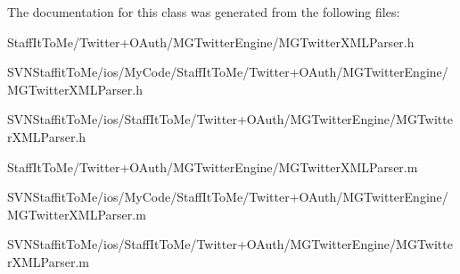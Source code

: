 \-The documentation for this class was generated from the following files\-:\begin{DoxyCompactItemize}
\item 
\-Staff\-It\-To\-Me/\-Twitter+\-O\-Auth/\-M\-G\-Twitter\-Engine/\-M\-G\-Twitter\-X\-M\-L\-Parser.\-h\item 
\-S\-V\-N\-Staffit\-To\-Me/ios/\-My\-Code/\-Staff\-It\-To\-Me/\-Twitter+\-O\-Auth/\-M\-G\-Twitter\-Engine/\-M\-G\-Twitter\-X\-M\-L\-Parser.\-h\item 
\-S\-V\-N\-Staffit\-To\-Me/ios/\-Staff\-It\-To\-Me/\-Twitter+\-O\-Auth/\-M\-G\-Twitter\-Engine/\-M\-G\-Twitter\-X\-M\-L\-Parser.\-h\item 
\-Staff\-It\-To\-Me/\-Twitter+\-O\-Auth/\-M\-G\-Twitter\-Engine/\-M\-G\-Twitter\-X\-M\-L\-Parser.\-m\item 
\-S\-V\-N\-Staffit\-To\-Me/ios/\-My\-Code/\-Staff\-It\-To\-Me/\-Twitter+\-O\-Auth/\-M\-G\-Twitter\-Engine/\-M\-G\-Twitter\-X\-M\-L\-Parser.\-m\item 
\-S\-V\-N\-Staffit\-To\-Me/ios/\-Staff\-It\-To\-Me/\-Twitter+\-O\-Auth/\-M\-G\-Twitter\-Engine/\-M\-G\-Twitter\-X\-M\-L\-Parser.\-m\end{DoxyCompactItemize}
